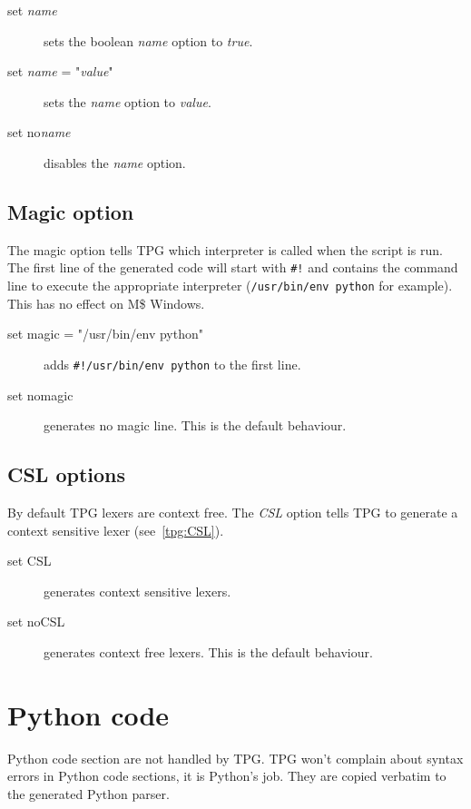 \begin{description}
	\item [set \emph{name}] sets the boolean \emph{name} option to \emph{true}.
	\item [set \emph{name} = "\emph{value}"] sets the \emph{name} option to \emph{value}.
	\item [set no\emph{name}] disables the \emph{name} option.
\end{description}

\subsection{Magic option}

The magic option tells TPG which interpreter is called when the script is run.
The first line of the generated code will start with \verb$#!$ and contains the command line to execute the appropriate interpreter (\verb$/usr/bin/env python$ for example).
This has no effect on M\$ Windows.

\begin{description}
	\item [set magic = "/usr/bin/env python"] adds \verb$#!/usr/bin/env python$ to the first line.
	\item [set nomagic] generates no magic line. This is the default behaviour.
\end{description}

\subsection{CSL options}									\label{grammar:CSL}

By default TPG lexers are context free.
The \emph{CSL} option tells TPG to generate a context sensitive lexer (see~\ref{tpg:CSL}).

\begin{description}
	\item [set CSL] generates context sensitive lexers.
	\item [set noCSL] generates context free lexers. This is the default behaviour.
\end{description}

\section{Python code}										\label{grammar:code}

Python code section are not handled by TPG.
TPG won't complain about syntax errors in Python code sections, it is Python's job.
They are copied verbatim to the generated Python parser.

